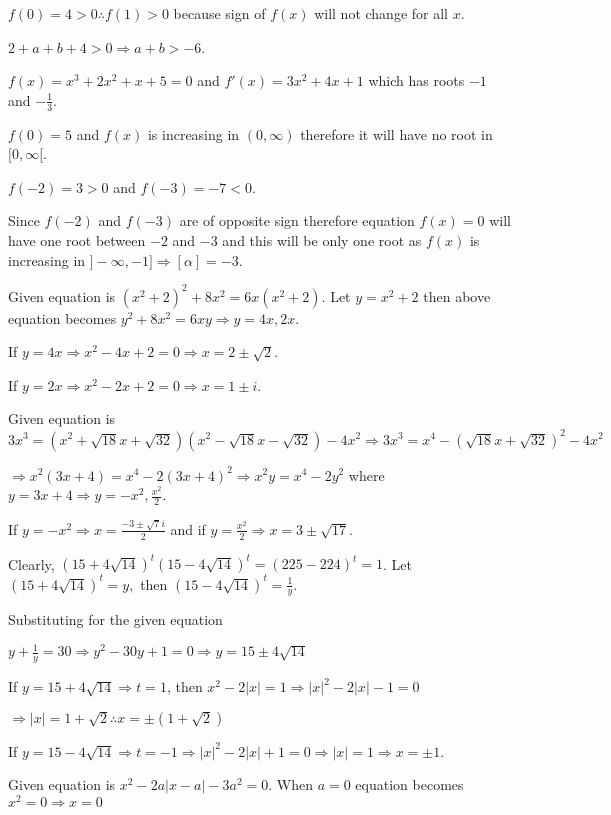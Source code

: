   $f(0) = 4 > 0 \therefore f(1) > 0$ because sign of $f(x)$ will not change for all $x$.

  $2 + a + b + 4 > 0 \Rightarrow a + b > - 6$.
\item $f(x) = x^3 + 2x^2 + x + 5 = 0$ and $f'(x) = 3x^2 + 4x + 1$ which has roots $-1$ and
  $-\frac{1}{3}$.

  $f(0) = 5$ and $f(x)$ is increasing in $(0, \infty)$ therefore it will have no root in $[0,
  \infty[$.

  $f(-2) = 3 > 0$ and $f(-3) = -7 < 0$.

  Since $f(-2)$ and $f(-3)$ are of opposite sign therefore equation $f(x) = 0$ will have one root
  between $-2$ and $-3$ and this will be only one root as $f(x)$ is increasing in $]-\infty,
  -1]\Rightarrow [\alpha] = -3$.
\item Given equation is $(x^2 + 2)^2 + 8x^2 = 6x(x^2 + 2)$. Let $y = x^2 + 2$ then above equation becomes
  $y^2 + 8x^2 = 6xy\Rightarrow y = 4x, 2x$.

  If $y = 4x \Rightarrow x^2 - 4x + 2 = 0 \Rightarrow x = 2 \pm \sqrt{2}$.

  If $y = 2x \Rightarrow x^2 - 2x + 2 = 0 \Rightarrow x = 1 \pm i$.
\item Given equation is $3x^3 = (x^2 + \sqrt{18}x + \sqrt{32})(x^2 - \sqrt{18}x - \sqrt{32}) -
  4x^2\Rightarrow 3x^3 = x^4 - (\sqrt{18}x + \sqrt{32})^2 - 4x^2$

  $\Rightarrow x^2(3x + 4) = x^4 - 2(3x + 4)^2\Rightarrow x^2y = x^4 - 2y^2$ where $y = 3x + 4\Rightarrow y
  = -x^2, \frac{x^2}{2}$.

  If $y = -x^2 \Rightarrow x = \frac{-3 \pm \sqrt{7}i}{2}$ and if $y = \frac{x^2}{2} \Rightarrow x = 3 \pm
  \sqrt{17}$.
\item Clearly, $(15 + 4\sqrt{14})^t(15 - 4\sqrt{14})^t = (225 - 224)^t = 1$. Let $(15 + 4\sqrt{14})^t = y,$
  then $(15 - 4\sqrt{14})^t = \frac{1}{y}$.

  Substituting for the given equation

  $y + \frac{1}{y} = 30 \Rightarrow y^2 - 30y + 1 = 0\Rightarrow y = 15 \pm 4\sqrt{14}$

  If $y = 15 + 4\sqrt{14} \Rightarrow t = 1$, then $x^2 - 2|x| = 1 \Rightarrow |x|^2 - 2|x| - 1 = 0$

  $\Rightarrow |x| = 1 + \sqrt{2} \therefore x = \pm(1 + \sqrt{2})$

  If $y = 15 - 4\sqrt{14} \Rightarrow t = -1\Rightarrow |x|^2 - 2|x| + 1 = 0 \Rightarrow |x| = 1 \Rightarrow
  x = \pm1$.
\item Given equation is $x^2 - 2a|x - a| - 3a^2 = 0$. When $a = 0$ equation becomes $x^2 = 0 \Rightarrow x = 0$

